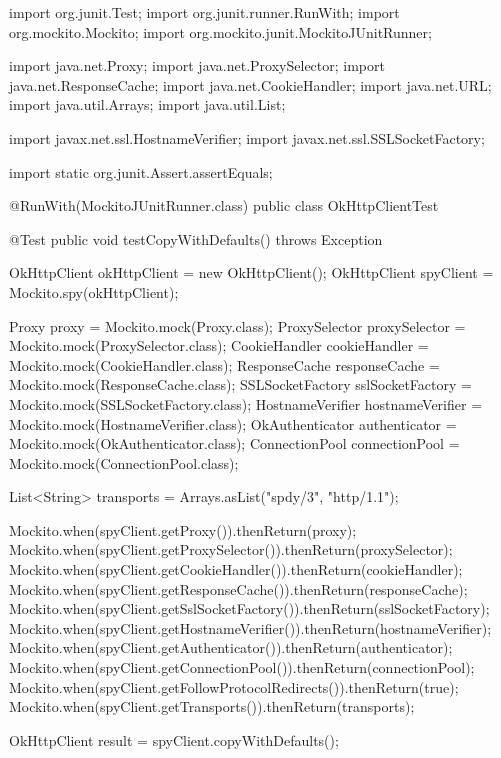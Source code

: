 \begin{answer}
  import org.junit.Test;
import org.junit.runner.RunWith;
import org.mockito.Mockito;
import org.mockito.junit.MockitoJUnitRunner;

import java.net.Proxy;
import java.net.ProxySelector;
import java.net.ResponseCache;
import java.net.CookieHandler;
import java.net.URL;
import java.util.Arrays;
import java.util.List;

import javax.net.ssl.HostnameVerifier;
import javax.net.ssl.SSLSocketFactory;

import static org.junit.Assert.assertEquals;

@RunWith(MockitoJUnitRunner.class)
public class OkHttpClientTest {

    @Test
    public void testCopyWithDefaults() throws Exception {
        OkHttpClient okHttpClient = new OkHttpClient();
        OkHttpClient spyClient = Mockito.spy(okHttpClient);

        Proxy proxy = Mockito.mock(Proxy.class);
        ProxySelector proxySelector = Mockito.mock(ProxySelector.class);
        CookieHandler cookieHandler = Mockito.mock(CookieHandler.class);
        ResponseCache responseCache = Mockito.mock(ResponseCache.class);
        SSLSocketFactory sslSocketFactory = Mockito.mock(SSLSocketFactory.class);
        HostnameVerifier hostnameVerifier = Mockito.mock(HostnameVerifier.class);
        OkAuthenticator authenticator = Mockito.mock(OkAuthenticator.class);
        ConnectionPool connectionPool = Mockito.mock(ConnectionPool.class);

        List<String> transports = Arrays.asList("spdy/3", "http/1.1");

        Mockito.when(spyClient.getProxy()).thenReturn(proxy);
        Mockito.when(spyClient.getProxySelector()).thenReturn(proxySelector);
        Mockito.when(spyClient.getCookieHandler()).thenReturn(cookieHandler);
        Mockito.when(spyClient.getResponseCache()).thenReturn(responseCache);
        Mockito.when(spyClient.getSslSocketFactory()).thenReturn(sslSocketFactory);
        Mockito.when(spyClient.getHostnameVerifier()).thenReturn(hostnameVerifier);
        Mockito.when(spyClient.getAuthenticator()).thenReturn(authenticator);
        Mockito.when(spyClient.getConnectionPool()).thenReturn(connectionPool);
        Mockito.when(spyClient.getFollowProtocolRedirects()).thenReturn(true);
        Mockito.when(spyClient.getTransports()).thenReturn(transports);

        OkHttpClient result = spyClient.copyWithDefaults();

}}
\end{answer}
